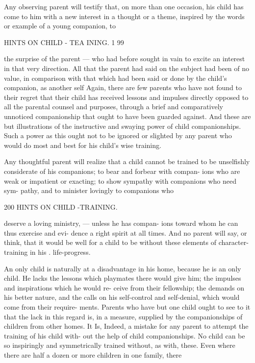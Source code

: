 \documentclass[
]{book}
\begin{document}
Any observing parent will testify that, on more than one occasion, his child has come to him with a new interest in a thought or a theme, inspired by the words or example of a young companion, to

HINTS ON CHILD - TEA INING. 1 99

the surprise of the parent --- who had before sought in vain to excite an interest in that very direction. All that the parent had said on the subject had been of no value, in comparison with that which had been said or done by the child's companion, as another self Again, there are few parents who have not found to their regret that their child has received lessons and impulses directly opposed to all the parental counsel and purposes, through a brief and comparatively unnoticed companionship that ought to have been guarded against. And these are but illustrations of the instructive and swaying power of child companionships. Such a power as this ought not to be ignored or slighted by any parent who would do most and best for his child's wise training.

Any thoughtful parent will realize that a child cannot be trained to be unselfishly considerate of his companions; to bear and forbear with compan- ions who are weak or impatient or exacting; to show sympathy with companions who need sym- pathy, and to minister lovingly to companions who

200 HINTS ON CHILD -TRAINING.

deserve a loving ministry, --- unless he has compan- ions toward whom he can thus exercise and evi- dence a right spirit at all times. And no parent will say, or think, that it would be well for a child to be without these elements of character-training in his . life-progress.

An only child is naturally at a disadvantage in his home, because he is an only child. He lacks the lessons which playmates there would give him; the impulses and inspirations which he would re- ceive from their fellowship; the demands on his better nature, and the calls on his self-control and self-denial, which would come from their require- ments. Parents who have but one child ought to see to it that the lack in this regard is, in a measure, supplied by the companionships of children from other homes. It Is, Indeed, a mistake for any parent to attempt the training of his child with- out the help of child companionships. No child can be so inspiringly and symmetrically trained without, as with, these. Even where there are half a dozen or more children in one family, there
\end{document}
